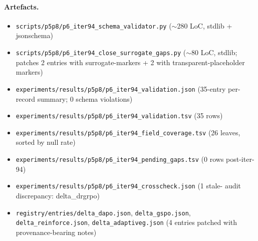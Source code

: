 \paragraph{Artefacts.}
\begin{itemize}\itemsep0pt
\item \texttt{scripts/p5p8/p6\_iter94\_schema\_validator.py} ($\sim$280 LoC,
  stdlib + jsonschema)
\item \texttt{scripts/p5p8/p6\_iter94\_close\_surrogate\_gaps.py} ($\sim$80 LoC,
  stdlib; patches 2 entries with surrogate-markers + 2 with
  transparent-placeholder markers)
\item \texttt{experiments/results/p5p8/p6\_iter94\_validation.json} (35-entry
  per-record summary; 0 schema violations)
\item \texttt{experiments/results/p5p8/p6\_iter94\_validation.tsv} (35 rows)
\item \texttt{experiments/results/p5p8/p6\_iter94\_field\_coverage.tsv}
  (26 leaves, sorted by null rate)
\item \texttt{experiments/results/p5p8/p6\_iter94\_pending\_gaps.tsv}
  (0 rows post-iter-94)
\item \texttt{experiments/results/p5p8/p6\_iter94\_crosscheck.json} (1 stale-
  audit discrepancy: delta\_drgrpo)
\item \texttt{registry/entries/delta\_dapo.json}, \texttt{delta\_gspo.json},
  \texttt{delta\_reinforce.json}, \texttt{delta\_adaptiveg.json} (4 entries
  patched with provenance-bearing notes)
\end{itemize}